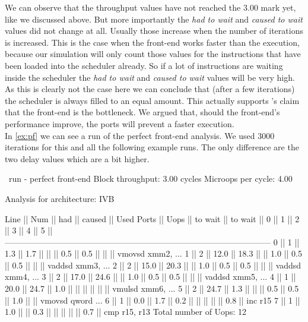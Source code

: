 We can observe that the throughput values have not reached the $3.00$ mark yet, like we discussed above. But more importantly the \emph{had to wait} and \emph{caused to wait} values did not change at all. Usually those increase when the number of iterations is increased. This is the case when the front-end works faster than the execution, because our simulation will only count those values for the instructions that have been loaded into the scheduler already. So if a lot of instructions are waiting inside the scheduler the \emph{had to wait} and \emph{caused to wait} values will be very high. As this is clearly not the case here we can conclude that (after a few iterations) the scheduler is always filled to an equal amount. This actually supports \iaca's claim that the front-end is the bottleneck. We argued that, should the front-end's performance improve, the ports will prevent a faster execution.\\
In \autoref{ex:pf} we can see a run of the perfect front-end analysis. We used $3000$ iterations for this and all the following example runs. The only difference are the two delay values which are a bit higher.


\begin{LabeledExample}{\suaca\ run - perfect front-end}{\label{ex:pf}}
    Block throughput: 3.00 cycles
    Microops per cycle: 4.00
    
    Analysis for architecture: IVB
    
     Line  ||   Num   ||   had   || caused  ||            Used Ports
           ||   Uops  || to wait || to wait ||   0   ||   1   ||   2   ||   3   ||   4   ||   5   ||
     ------------------------------------------------------------------------------------------------
       0   ||    1    ||   1.3   ||   1.7   ||       ||       ||  0.5  ||  0.5  ||       ||       || vmovsd xmm2, ...
       1   ||    2    ||  12.0   ||  18.3   ||       ||  1.0  ||  0.5  ||  0.5  ||       ||       || vaddsd xmm3, ...
       2   ||    2    ||  15.0   ||  20.3   ||       ||  1.0  ||  0.5  ||  0.5  ||       ||       || vaddsd xmm4, ...
       3   ||    2    ||  17.0   ||  24.6   ||       ||  1.0  ||  0.5  ||  0.5  ||       ||       || vaddsd xmm5, ...
       4   ||    1    ||  20.0   ||  24.7   ||  1.0  ||       ||       ||       ||       ||       || vmulsd xmm6, ...
       5   ||    2    ||  24.7   ||   1.3   ||       ||       ||  0.5  ||  0.5  ||  1.0  ||       || vmovsd qword ...
       6   ||    1    ||   0.0   ||   1.7   ||  0.2  ||       ||       ||       ||       ||  0.8  || inc r15
       7   ||    1    ||   1.0   ||         ||  0.3  ||       ||       ||       ||       ||  0.7  || cmp r15, r13
    Total number of Uops: 12
\end{LabeledExample}


